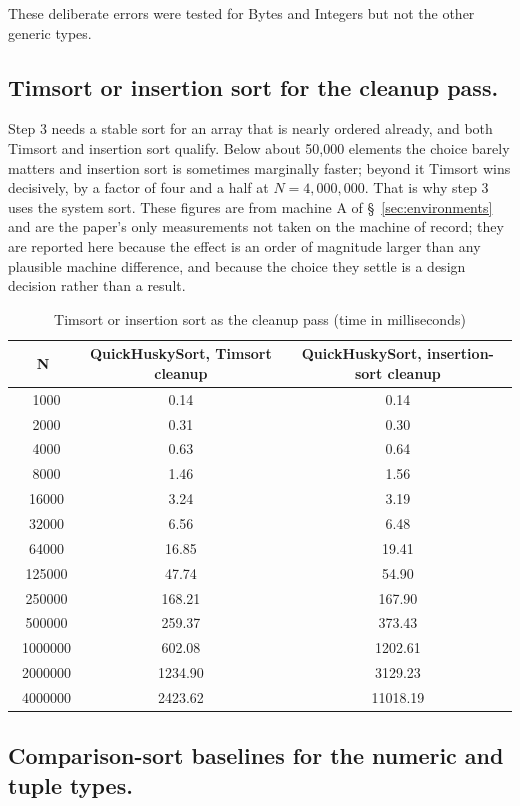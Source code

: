 \documentclass[twoside,leqno,twocolumn]{article}
\begin{document}
These deliberate errors were tested for Bytes and Integers but not the other generic types.

\subsection{Timsort or insertion sort for the cleanup pass.}
\label{sec:cleanup-choice}

Step 3 needs a stable sort for an array that is nearly ordered already, and both Timsort and insertion
sort qualify.
Below about 50,000 elements the choice barely matters and insertion sort is sometimes marginally
faster; beyond it Timsort wins decisively, by a factor of four and a half at $N = 4{,}000{,}000$.
That is why step 3 uses the system sort.
These figures are from machine A of \S~\ref{sec:environments} and are the paper's only measurements not
taken on the machine of record; they are reported here because the effect is an order of magnitude
larger than any plausible machine difference, and because the choice they settle is a design decision
rather than a result.

\begin{table}
  \caption{Timsort or insertion sort as the cleanup pass (time in milliseconds)}
  \label{tab:TimvsInsertion}
  \centering
  \begin{tabular}{ccc}
    \toprule
    N & QuickHuskySort, Timsort cleanup & QuickHuskySort, insertion-sort cleanup \\
    \midrule
    \ 1000&0.14&0.14 \\
\ 2000&0.31&0.30 \\
\ 4000&0.63&0.64 \\
\ 8000&1.46&1.56 \\
\ 16000&3.24&3.19 \\
\ 32000&6.56&6.48 \\
\ 64000&16.85&19.41 \\
\ 125000&47.74&54.90 \\
\ 250000&168.21&167.90 \\
\ 500000&259.37&373.43 \\
\ 1000000&602.08&1202.61 \\
\ 2000000&1234.90&3129.23 \\
\ 4000000&2423.62&11018.19 \\

    \bottomrule
  \end{tabular}
\end{table}

\subsection{Comparison-sort baselines for the numeric and tuple types.}
\label{sec:comparison-baselines}
\end{document}
